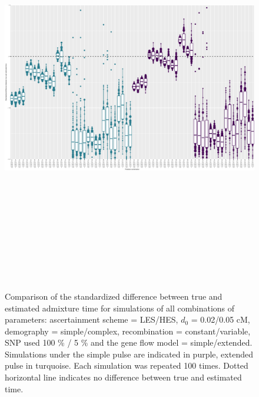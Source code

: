 \documentclass[11pt]{article}
\begin{document}
\begin{figure}
\centering
\includegraphics[width=16cm,height=18cm,keepaspectratio]{ATE_Revisions_files/figure-latex/figS2_updated_SP-1.pdf}
\caption{\label{fig:figSGLM_data} Comparison of the standardized difference between true and estimated admixture time for simulations of all combinations of parameters: ascertainment scheme = LES/HES,  $d_{0}$ = 0.02/0.05 cM, demography = simple/complex, recombination = constant/variable, SNP used 100 \% / 5 \% and the gene flow model = simple/extended. Simulations under the simple pulse are indicated in purple, extended pulse in turquoise. Each simulation was repeated 100 times. Dotted horizontal line indicates no difference between true and estimated time.}
\end{figure}
\end{document}
